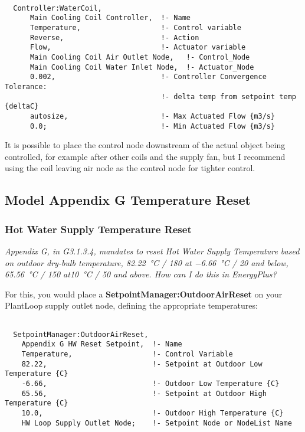 \begin{lstlisting}

  Controller:WaterCoil,
      Main Cooling Coil Controller,  !- Name
      Temperature,                   !- Control variable
      Reverse,                       !- Action
      Flow,                          !- Actuator variable
      Main Cooling Coil Air Outlet Node,   !- Control_Node
      Main Cooling Coil Water Inlet Node,  !- Actuator_Node
      0.002,                         !- Controller Convergence Tolerance:
                                     !- delta temp from setpoint temp {deltaC}
      autosize,                      !- Max Actuated Flow {m3/s}
      0.0;                           !- Min Actuated Flow {m3/s}
\end{lstlisting}

It is possible to place the control node downstream of the actual object being controlled, for example after other coils and the supply fan, but I recommend using the coil leaving air node as the control node for tighter control.



\subsection{Model Appendix G Temperature Reset}%
\label{sub:model_appendix_g_temperature_reset}

\subsubsection{Hot Water Supply Temperature Reset}%
\label{ssub:hot_water_supply_temperature_reset}

\emph{Appendix G, in G3.1.3.4, mandates to reset Hot Water Supply Temperature based on outdoor dry-bulb temperature, \SI{82.22}{\celsius} / \SI{180}{\farenheit} at \SI{-6.66}{\celsius} / \SI{20}{\farenheit} and below, \SI{65.56}{\celsius} / \SI{150}{\farenheit} at\SI{10}{\celsius} / \SI{50}{\farenheit} and above. How can I do this in EnergyPlus?}

For this, you would place a \textbf{SetpointManager:OutdoorAirReset} on your PlantLoop supply outlet node, defining the appropriate temperatures:

\begin{lstlisting}

  SetpointManager:OutdoorAirReset,
    Appendix G HW Reset Setpoint,  !- Name
    Temperature,                   !- Control Variable
    82.22,                         !- Setpoint at Outdoor Low Temperature {C}
    -6.66,                         !- Outdoor Low Temperature {C}
    65.56,                         !- Setpoint at Outdoor High Temperature {C}
    10.0,                          !- Outdoor High Temperature {C}
    HW Loop Supply Outlet Node;    !- Setpoint Node or NodeList Name

\end{lstlisting}


